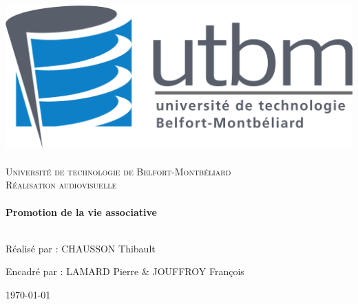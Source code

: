 
\thispagestyle{empty}
    \begin{sffamily}
        \begin{center}





            \includegraphics[scale=0.2]{ressources/logo}~\\[1cm]

            \textsc{\LARGE Université de technologie de Belfort-Montbéliard}\\[2cm]

            \textsc{\Large Réalisation audiovisuelle}\\[1cm]

            {\color{UTBMcolor}\HRule} \\[0.4cm]
            { \huge \bfseries Promotion de la vie associative\\[0.4cm] }
            {\color{UTBMcolor}\HRule} \\[1,5cm]



            \begin{center}
                Réalisé par : CHAUSSON Thibault
    
                \vspace{0,5cm}
                
                Encadré par : LAMARD Pierre \& JOUFFROY François
            \end{center}




            \vfill

            \textsc{\large \today}

        \end{center}
    \end{sffamily}

